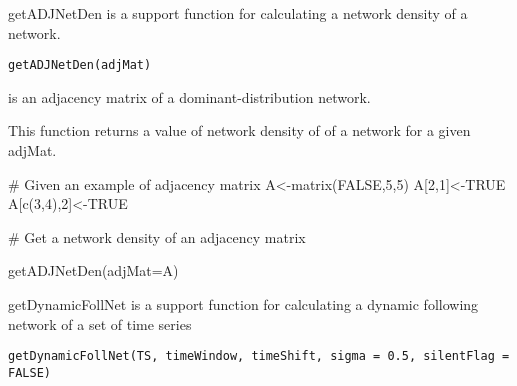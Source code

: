 \documentclass[a4paper]{book}
\begin{document}
%
\begin{Description}\relax
getADJNetDen is a support function for calculating a network density of a network.
\end{Description}
%
\begin{Usage}
\begin{verbatim}
getADJNetDen(adjMat)
\end{verbatim}
\end{Usage}
%
\begin{Arguments}
\begin{ldescription}
\item[\code{adjMat}] is an adjacency matrix of a dominant-distribution network.
\end{ldescription}
\end{Arguments}
%
\begin{Value}
This function returns a value of network density of of a network for a given adjMat.
\end{Value}
%
\begin{Examples}
\begin{ExampleCode}

# Given an example of adjacency matrix
A<-matrix(FALSE,5,5)
A[2,1]<-TRUE
A[c(3,4),2]<-TRUE

# Get a network density of an adjacency matrix

getADJNetDen(adjMat=A)

\end{ExampleCode}
\end{Examples}
%
\begin{Description}\relax
getDynamicFollNet is a support function for calculating a dynamic following network of a set of time series
\end{Description}
%
\begin{Usage}
\begin{verbatim}
getDynamicFollNet(TS, timeWindow, timeShift, sigma = 0.5, silentFlag = FALSE)
\end{verbatim}
\end{Usage}
%
\end{document}
